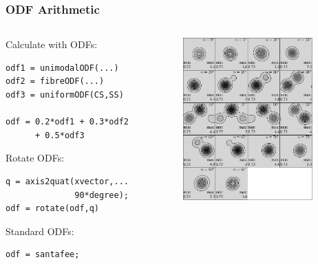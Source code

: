 \begin{frame}[fragile]
  \frametitle{ODF Arithmetic}


  \begin{columns}
    \begin{column}{6cm}

      Calculate with ODFs:
\begin{lstlisting}
odf1 = unimodalODF(...)
odf2 = fibreODF(...)
odf3 = uniformODF(CS,SS)

odf = 0.2*odf1 + 0.3*odf2
      + 0.5*odf3

\end{lstlisting}

  Rotate ODFs:
\begin{lstlisting}
q = axis2quat(xvector,...
              90*degree);
odf = rotate(odf,q)
\end{lstlisting}


  Standard ODFs:
\begin{lstlisting}
odf = santafee;
\end{lstlisting}


\end{column}
\begin{column}{5cm}
  \includegraphics[width=5cm]{pic/santafeeh}
\end{column}
\end{columns}

\end{frame}

